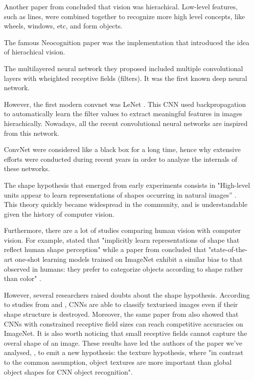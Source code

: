 \documentclass{article}
\begin{document}
\noindent 
Another paper from \cite{marr1982vision} concluded that vision was hierachical. Low-level features, such as lines,
were combined together to recognize more high level concepts, 
like wheels, windows, etc, and form objects. \medskip \par 

\noindent
The famous Neocognition paper \cite{neocognitron} was 
the implementation that introduced the idea of hierachical vision. 

\noindent
The multilayered neural network they proposed 
included multiple convolutional layers with wheighted receptive fields (filters).
It was the first known deep neural network. \medskip \par

\noindent
However, the first modern convnet was LeNet \cite{Lecun98gradient-basedlearning}.
This CNN used backpropagation to automatically learn the filter values to extract meaningful 
features in images hierachically.
Nowadays, all the recent convolutional neural networks are inspired from this network. \medskip \par

\noindent
ConvNet were considered like a black box for a long time, 
hence why extensive efforts were conducted during recent years in order 
to analyze the internals of these networks. \medskip \par

\noindent
The shape hypothesis that emerged from early experiments consists in
"High-level units appear to learn representations of shapes occurring in natural images” 
\cite{Kriegeskorte029876}. This theory quickly became widespread in the community, and
is understandable given the history of computer vision. \medskip \par

\noindent
Furthermore, there are a lot of studies comparing human vision with computer vision. For example,
\cite{kubiliusshape} stated that 
"implicitly learn representations of shape that reflect human shape perception"
while a paper from \cite{ritter2017cognitive} concluded that 
"state-of-the-art one-shot learning models trained on ImageNet exhibit  
a similar bias to that observed in humans: they prefer to categorize objects according  
to shape rather than color" . \medskip \par

\noindent
However, several researchers raised doubts about the shape hypothesis.
According to studies from \cite{gatys2017textures} and \cite{brendel2019approximating}, 
CNNs are able to classify texturised images even if their shape structure is destroyed.
Moreover, the same paper from \cite{brendel2019approximating} also
showed that CNNs with constrained receptive field sizes can reach competitive accuracies on ImageNet.
It is also worth noticing that small receptive fields cannot capture the overal shape of an image.
These results have led the authors of the paper we've analysed, \cite{geirhos2018imagenettrained}, 
to emit a new hypothesis: the texture hypothesis, where "in contrast to the
common assumption, object textures are more important than global object shapes for CNN object
recognition". \medskip \par
\end{document}
